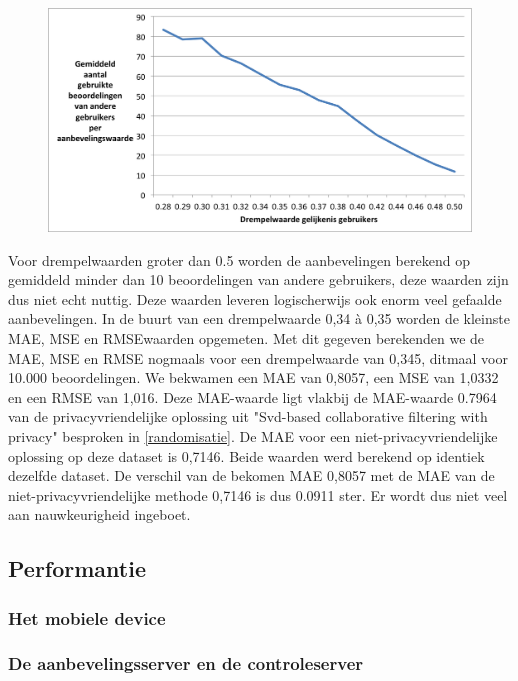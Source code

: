 \begin{figure}[htpb]   
    \label{Figuur::usedratings}      
  \begin{center}    
 \includegraphics[width=\textwidth]{fig/usedratings}    
  \end{center}   
\end{figure}
Voor drempelwaarden groter dan 0.5 worden de aanbevelingen berekend op gemiddeld minder dan 10 beoordelingen van andere gebruikers, deze waarden zijn dus niet echt nuttig. Deze waarden leveren logischerwijs ook enorm veel gefaalde aanbevelingen. In de buurt van een drempelwaarde 0,34 \`a 0,35 worden de kleinste MAE, MSE en RMSEwaarden opgemeten. Met dit gegeven berekenden we de MAE, MSE en RMSE nogmaals voor een drempelwaarde van 0,345, ditmaal voor 10.000 beoordelingen. We bekwamen een MAE van 0,8057, een MSE van 1,0332 en een RMSE van 1,016. Deze MAE-waarde ligt vlakbij de MAE-waarde 0.7964 van de privacyvriendelijke oplossing uit "Svd-based collaborative filtering with privacy\cite{Polat:2005:SCF:1066677.1066860}" besproken in \ref{randomisatie}. De MAE voor een niet-privacyvriendelijke oplossing op deze dataset is 0,7146. Beide waarden werd berekend op identiek dezelfde dataset. De verschil van de bekomen MAE 0,8057 met de MAE van de niet-privacyvriendelijke methode 0,7146 is dus 0.0911 ster. Er wordt dus niet veel aan nauwkeurigheid ingeboet.
\subsection{Performantie}
\subsubsection{Het mobiele device}
\subsubsection{De aanbevelingsserver en de controleserver}